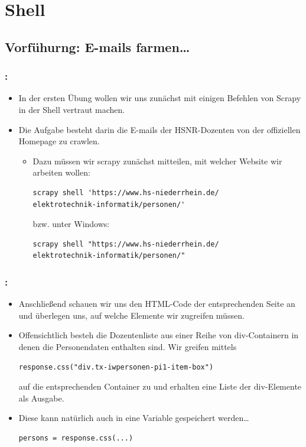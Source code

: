 \documentclass{beamer}
\begin{document}
\section{Shell}
\subsection{Vorfühurng: E-mails farmen\ldots}
\begin{frame}[fragile]
	\frametitle{\insertsection{}: \insertsubsection{}}
	\begin{itemize}
		\item In der ersten Übung wollen wir uns zunächst mit einigen Befehlen von
		Scrapy in der Shell vertraut machen.
		\item Die Aufgabe besteht darin die E-mails der HSNR-Dozenten von der
		offiziellen Homepage zu crawlen.
		\begin{itemize}
			\item Dazu müssen wir scrapy zunächst mitteilen, mit welcher Website wir
			arbeiten wollen: 

			\begin{lstlisting}  
scrapy shell 'https://www.hs-niederrhein.de/
elektrotechnik-informatik/personen/'
			\end{lstlisting}
			
			bzw. unter Windows:
			
			\begin{lstlisting}  
scrapy shell "https://www.hs-niederrhein.de/
elektrotechnik-informatik/personen/"
			\end{lstlisting}
						

		\end{itemize}
	\end{itemize}
\end{frame}

\framebreak


\begin{frame}[fragile]
	\frametitle{\insertsection{}: \insertsubsection{}}
	\begin{itemize}
		\item Anschließend schauen wir uns den HTML-Code der entsprechenden Seite an
		und überlegen uns, auf welche Elemente wir zugreifen müssen.
		\item Offensichtlich besteh die Dozentenliste aus einer Reihe von
		div-Containern in denen die Personendaten enthalten sind. Wir greifen mittels 
			\begin{lstlisting}  
response.css("div.tx-iwpersonen-pi1-item-box")
			\end{lstlisting}
		auf die entsprechenden Container zu und erhalten eine Liste der div-Elemente
		als Ausgabe.
		\item Diese kann natürlich auch in eine Variable gespeichert werden\ldots
		\begin{lstlisting}  
persons = response.css(...)
			\end{lstlisting}
	\end{itemize}
\end{frame}
\end{document}
